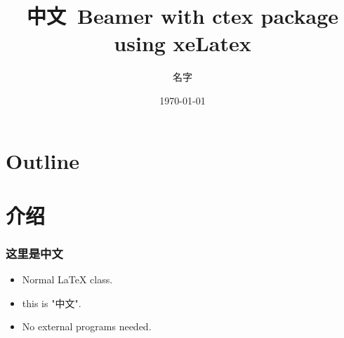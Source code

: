 \documentclass{beamer}
\title{中文~Beamer with ctex package using xeLatex }
\author{名字}
\date{\today}
\begin{document}
\frame{\titlepage}

\section*{Outline}

\frame{\tableofcontents}

\section{介绍}

\begin{frame}
  \frametitle{这里是中文}
  \begin{itemize}
  \item Normal LaTeX class.
  \item this is "中文".
  \item No external programs needed.
  \end{itemize}
\end{frame}
\end{document}
